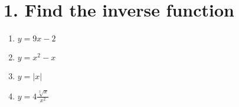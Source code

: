 \documentclass{hw}
\begin{document}
\section*{\normalsize 1. Find the inverse function}
\begin{enumerate}[label=\alph*.]
    \item $y = 9x - 2$
    \studentxxlargeworkspace
    \item $y = x^2 - x$
    \studentxxlargeworkspace
    \item $y = |x|$
    \studentxxlargeworkspace
    \item $y = 4\frac{\sqrt[3]{x}}{x^2}$
\end{enumerate}
\end{document}
